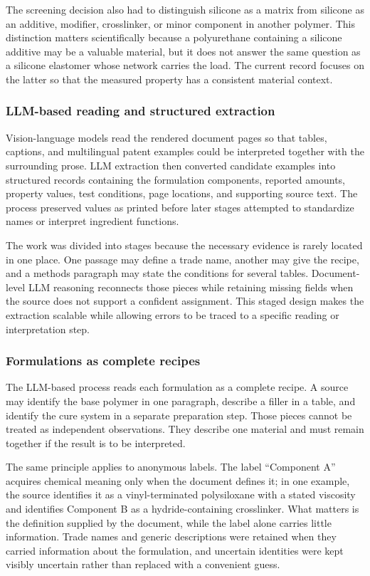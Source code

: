 \documentclass[10pt]{article}
\begin{document}
The screening decision also had to distinguish silicone as a matrix from
silicone as an additive, modifier, crosslinker, or minor component in another
polymer. This distinction matters scientifically because a polyurethane
containing a silicone additive may be a valuable material, but it does not
answer the same question as a silicone elastomer whose network carries the
load. The current record focuses on the latter so that the measured property
has a consistent material context.

\subsubsection{LLM-based reading and structured extraction}
Vision-language models read the rendered document pages so that tables,
captions, and multilingual patent examples could be interpreted together with
the surrounding prose. LLM extraction then converted candidate examples into
structured records containing the formulation components, reported amounts,
property values, test conditions, page locations, and supporting source text.
The process preserved values as printed before later stages attempted to
standardize names or interpret ingredient functions.

The work was divided into stages because the necessary evidence is rarely
located in one place. One passage may define a trade name, another may give the
recipe, and a methods paragraph may state the conditions for several tables.
Document-level LLM reasoning reconnects those pieces while retaining missing
fields when the source does not support a confident assignment. This staged
design makes the extraction scalable while allowing errors to be traced to a
specific reading or interpretation step.

\subsubsection{Formulations as complete recipes}
The LLM-based process reads each formulation as a complete recipe. A
source may identify the base polymer in one paragraph, describe a filler in a
table, and identify the cure system in a separate preparation step. Those
pieces cannot be treated as independent observations. They describe one
material and must remain together if the result is to be interpreted.

The same principle applies to anonymous labels. The label ``Component A''
acquires chemical meaning only when the document defines it; in one example,
the source identifies it as a vinyl-terminated polysiloxane with a stated
viscosity and identifies Component B as a hydride-containing crosslinker. What
matters is the definition supplied by the document, while the label alone
carries little information. Trade names and generic descriptions were retained
when they carried information about the formulation, and uncertain identities
were kept visibly uncertain rather than replaced with a convenient guess.
\end{document}
